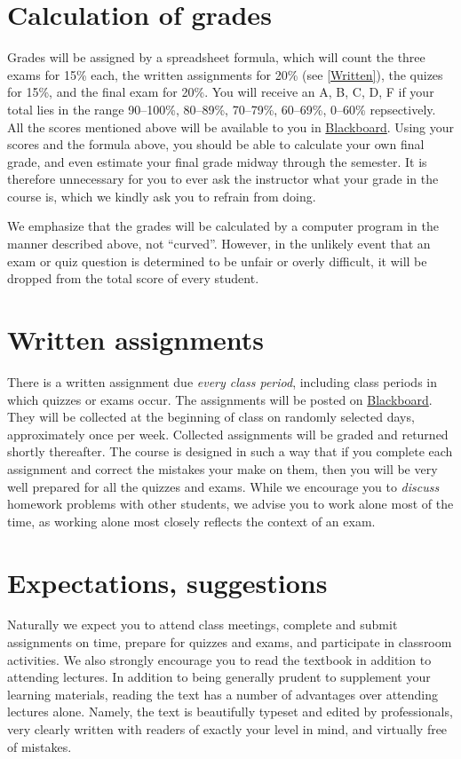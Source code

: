 \documentclass[11pt]{article}
\begin{document}
\section{Calculation of grades}\label{Assessment}
Grades will be assigned by a spreadsheet formula, which will count
the three exams for 15\% each,
the written assignments for 20\% (see \autoref{Written}),
the quizes for 15\%, and the final exam for 20\%.
You will receive an A, B, C, D, F if your total lies in the range
90--100\%, 80--89\%, 70--79\%, 60--69\%, 0--60\% repsectively.
All the scores mentioned above will be available to you in
\href{https://bb.its.iastate.edu}{Blackboard}. Using your scores
and the formula above, you should be able to calculate your own final grade,
and even estimate your final grade midway through the semester.
It is therefore unnecessary for you to ever ask the instructor
what your grade in the course is, which we kindly ask you to refrain from
doing.

We emphasize that the grades will be calculated by a computer program in the manner described
above, not ``curved''. However, in the unlikely event that an exam or quiz question is determined
to be unfair or overly difficult, it will be dropped from the total score of
every student.

\section{Written assignments}\label{Written}
There is a written assignment due {\em every 
class period}, including class periods
in which quizzes or exams occur.
The assignments will be posted on \href{https://bb.its.iastate.edu}{Blackboard}.
They will be collected at the beginning
of class on randomly selected days, approximately
once per week. Collected assignments
will be graded and returned shortly thereafter.
The course is designed in such a way that if you complete each assignment and 
correct the mistakes your make on them,
then you will be very well prepared for all the quizzes and exams.
While we encourage you to {\em discuss} homework problems with other
students, we advise you to work alone most of the time,
as working alone most closely reflects the context of an exam.

\section{Expectations, suggestions} Naturally we expect you to attend 
class meetings, complete and submit assignments on 
time, prepare for quizzes and exams, and participate in classroom 
activities. We also strongly encourage you to read the textbook
in addition to attending lectures.
In addition to being generally prudent to 
supplement your learning materials, reading the text has a number of 
advantages over attending lectures alone. Namely, the text is beautifully 
typeset and edited by professionals, very clearly written with readers 
of exactly your level in mind, and virtually free of mistakes.
\end{document}
